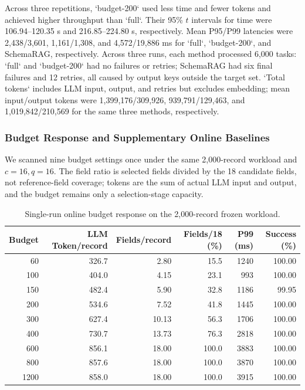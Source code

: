 \documentclass[runningheads]{llncs}
\newcommand{\schemarag}{SchemaRAG}
\begin{document}
\begin{sloppypar}
Across three repetitions, `budget-200` used less time and fewer tokens and achieved higher throughput than `full`. Their 95\% $t$ intervals for time were 106.94--120.35 s and 216.85--224.80 s, respectively. Mean P95/P99 latencies were 2,438/3,601, 1,161/1,308, and 4,572/19,886 ms for `full`, `budget-200`, and \schemarag{}, respectively. Across three runs, each method processed 6,000 tasks: `full` and `budget-200` had no failures or retries; \schemarag{} had six final failures and 12 retries, all caused by output keys outside the target set. `Total tokens` includes LLM input, output, and retries but excludes embedding; mean input/output tokens were 1,399,176/309,926, 939,791/129,463, and 1,019,842/210,569 for the same three methods, respectively.
\end{sloppypar}

\subsubsection{Budget Response and Supplementary Online Baselines}

We scanned nine budget settings once under the same 2,000-record workload and $c=16,q=16$. The field ratio is selected fields divided by the 18 candidate fields, not reference-field coverage; tokens are the sum of actual LLM input and output, and the budget remains only a selection-stage capacity.

\begin{table}[htbp]\centering\scriptsize\setlength{\tabcolsep}{3pt}
\caption{Single-run online budget response on the 2,000-record frozen workload.}\label{tab:budget-response}
\begin{tabular}{@{}rrrrrr@{}}\toprule
Budget & LLM Token/record & Fields/record & Fields/18 (\%) & P99 (ms) & Success (\%)\\\midrule
60 & 326.7 & 2.80 & 15.5 & 1240 & 100.00\\
100 & 404.0 & 4.15 & 23.1 & 993 & 100.00\\
150 & 482.4 & 5.90 & 32.8 & 1186 & 99.95\\
200 & 534.6 & 7.52 & 41.8 & 1445 & 100.00\\
300 & 627.4 & 10.13 & 56.3 & 1706 & 100.00\\
400 & 730.7 & 13.73 & 76.3 & 2818 & 100.00\\
600 & 856.1 & 18.00 & 100.0 & 3883 & 100.00\\
800 & 857.6 & 18.00 & 100.0 & 3870 & 100.00\\
1200 & 858.0 & 18.00 & 100.0 & 3915 & 100.00\\\bottomrule
\end{tabular}\end{table}
\end{document}
